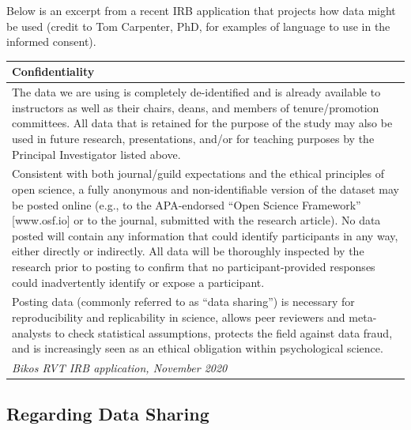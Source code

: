 \documentclass[
  english,
]{book}
\begin{document}
Below is an excerpt from a recent IRB application that projects how data might be used (credit to Tom Carpenter, PhD, for examples of language to use in the informed consent).

\begin{longtable}[]{@{}l@{}}
\toprule
\begin{minipage}[b]{0.97\columnwidth}\raggedright
Confidentiality\strut
\end{minipage}\tabularnewline
\midrule
\endhead
\begin{minipage}[t]{0.97\columnwidth}\raggedright
The data we are using is completely de-identified and is already available to instructors as well as their chairs, deans, and members of tenure/promotion committees. All data that is retained for the purpose of the study may also be used in future research, presentations, and/or for teaching purposes by the Principal Investigator listed above.\strut
\end{minipage}\tabularnewline
\begin{minipage}[t]{0.97\columnwidth}\raggedright
Consistent with both journal/guild expectations and the ethical principles of open science, a fully anonymous and non-identifiable version of the dataset may be posted online (e.g., to the APA-endorsed ``Open Science Framework'' {[}www.osf.io{]} or to the journal, submitted with the research article). No data posted will contain any information that could identify participants in any way, either directly or indirectly. All data will be thoroughly inspected by the research prior to posting to confirm that no participant-provided responses could inadvertently identify or expose a participant.\strut
\end{minipage}\tabularnewline
\begin{minipage}[t]{0.97\columnwidth}\raggedright
Posting data (commonly referred to as ``data sharing'') is necessary for reproducibility and replicability in science, allows peer reviewers and meta-analysts to check statistical assumptions, protects the field against data fraud, and is increasingly seen as an ethical obligation within psychological science.\strut
\end{minipage}\tabularnewline
\begin{minipage}[t]{0.97\columnwidth}\raggedright
\emph{Bikos RVT IRB application, November 2020}\strut
\end{minipage}\tabularnewline
\bottomrule
\end{longtable}

\hypertarget{regarding-data-sharing}{%
\subsection{Regarding Data Sharing}\label{regarding-data-sharing}}
\end{document}
